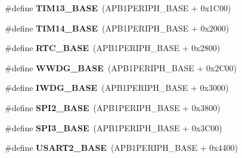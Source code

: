 \begin{DoxyCompactItemize}
\item 
\hypertarget{group___peripheral__memory__map_gad20f79948e9359125a40bbf6ed063590}{\#define {\bfseries T\-I\-M13\-\_\-\-B\-A\-S\-E}~(A\-P\-B1\-P\-E\-R\-I\-P\-H\-\_\-\-B\-A\-S\-E + 0x1\-C00)}\label{group___peripheral__memory__map_gad20f79948e9359125a40bbf6ed063590}

\item 
\hypertarget{group___peripheral__memory__map_ga862855347d6e1d92730dfe17ee8e90b8}{\#define {\bfseries T\-I\-M14\-\_\-\-B\-A\-S\-E}~(A\-P\-B1\-P\-E\-R\-I\-P\-H\-\_\-\-B\-A\-S\-E + 0x2000)}\label{group___peripheral__memory__map_ga862855347d6e1d92730dfe17ee8e90b8}

\item 
\hypertarget{group___peripheral__memory__map_ga4265e665d56225412e57a61d87417022}{\#define {\bfseries R\-T\-C\-\_\-\-B\-A\-S\-E}~(A\-P\-B1\-P\-E\-R\-I\-P\-H\-\_\-\-B\-A\-S\-E + 0x2800)}\label{group___peripheral__memory__map_ga4265e665d56225412e57a61d87417022}

\item 
\hypertarget{group___peripheral__memory__map_ga9a5bf4728ab93dea5b569f5b972cbe62}{\#define {\bfseries W\-W\-D\-G\-\_\-\-B\-A\-S\-E}~(A\-P\-B1\-P\-E\-R\-I\-P\-H\-\_\-\-B\-A\-S\-E + 0x2\-C00)}\label{group___peripheral__memory__map_ga9a5bf4728ab93dea5b569f5b972cbe62}

\item 
\hypertarget{group___peripheral__memory__map_ga8543ee4997296af5536b007cd4748f55}{\#define {\bfseries I\-W\-D\-G\-\_\-\-B\-A\-S\-E}~(A\-P\-B1\-P\-E\-R\-I\-P\-H\-\_\-\-B\-A\-S\-E + 0x3000)}\label{group___peripheral__memory__map_ga8543ee4997296af5536b007cd4748f55}

\item 
\hypertarget{group___peripheral__memory__map_gac3e357b4c25106ed375fb1affab6bb86}{\#define {\bfseries S\-P\-I2\-\_\-\-B\-A\-S\-E}~(A\-P\-B1\-P\-E\-R\-I\-P\-H\-\_\-\-B\-A\-S\-E + 0x3800)}\label{group___peripheral__memory__map_gac3e357b4c25106ed375fb1affab6bb86}

\item 
\hypertarget{group___peripheral__memory__map_gae634fe8faa6922690e90fbec2fc86162}{\#define {\bfseries S\-P\-I3\-\_\-\-B\-A\-S\-E}~(A\-P\-B1\-P\-E\-R\-I\-P\-H\-\_\-\-B\-A\-S\-E + 0x3\-C00)}\label{group___peripheral__memory__map_gae634fe8faa6922690e90fbec2fc86162}

\item 
\hypertarget{group___peripheral__memory__map_gade83162a04bca0b15b39018a8e8ec090}{\#define {\bfseries U\-S\-A\-R\-T2\-\_\-\-B\-A\-S\-E}~(A\-P\-B1\-P\-E\-R\-I\-P\-H\-\_\-\-B\-A\-S\-E + 0x4400)}\label{group___peripheral__memory__map_gade83162a04bca0b15b39018a8e8ec090}


\end{DoxyCompactItemize}
